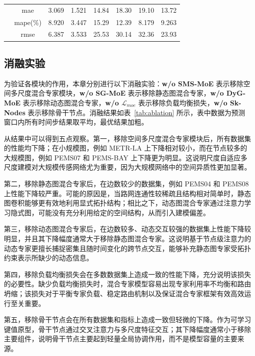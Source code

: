 \begin{table}[t!]
{\begin{tabular}{cc|cccccc}
        \midrule
        & mae & 3.069 & 1.521 & 14.84 & 18.30 & 19.10 & 13.72 \\
        & mape(\%) & 8.920 & 3.447 & 15.29 & 12.39 & 8.179 & 9.263 \\
        & rmse & 6.387 & 3.533 & 25.53 & 30.14 & 32.36 & 23.93 \\
        \bottomrule
    \end{tabular}
    }
    \vspace{-1em}
\end{table}
\subsection{消融实验}

为验证各模块的作用，本章分别进行以下消融实验：\textbf{w/o SMS-MoE} 表示移除空间多尺度混合专家模块，\textbf{w/o SG-MoE} 表示移除静态图混合专家，\textbf{w/o DyG-MoE} 表示移除动态图混合专家，\textbf{w/o $\mathcal{L}_{moe}$} 表示移除负载均衡损失，\textbf{w/o Sk-Nodes} 表示移除骨干节点。消融结果如表~\ref{tab:ablation} 所示，表中数据为预测窗口内所有时间步结果取平均，最优结果加粗。

从结果中可以得到五点观察。第一，移除空间多尺度混合专家模块后，所有数据集的性能均下降；在小规模图，例如 METR-LA 上下降相对较小，而在节点较多的大规模图，例如 PEMS07 和 PEMS-BAY 上下降更为明显。这说明尺度自适应多尺度建模对大规模传感网络尤为重要，因为大规模网络中的空间异质性更加显著。

第二，移除静态图混合专家后，在边数较少的数据集，例如 PEMS04 和 PEMS08 上性能下降较严重。可能的原因是，当路网连通性较稀疏且结构相对简单时，静态图卷积能够更有效地利用显式拓扑结构；相比之下，动态图混合专家通过注意力学习隐式图，可能没有充分利用给定的空间结构，从而引入建模偏差。

第三，移除动态图混合专家后，在边数较多、动态交互较强的数据集上性能下降较明显，并且其下降幅度通常大于移除静态图混合专家。这说明基于节点级注意力的动态专家更擅长捕捉密集且随时间变化的跨节点交互，能够补充静态图专家受拓扑约束表示所缺少的动态信息。

第四，移除负载均衡损失会在多数数据集上造成一致的性能下降，充分说明该损失的必要性。缺少负载均衡损失时，混合专家模型容易出现专家利用率不均衡和路由坍缩；该损失对于平衡专家负载、稳定路由机制以及保证混合专家框架有效高效运行至关重要。

第五，移除骨干节点会在所有数据集和指标上造成一致但轻微的下降。作为可学习键值原型，骨干节点通过交叉注意力与多尺度特征交互；其下降幅度通常小于移除主要组件，说明骨干节点主要起到轻量全局协调作用，而不是模型容量的主要来源。

